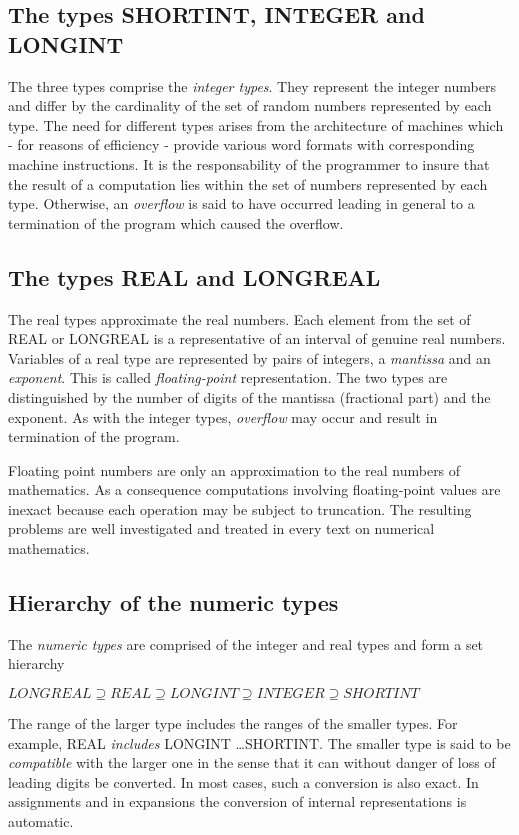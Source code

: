 \documentclass[a4paper,11pt]{article}
\begin{document}
\subsection{The types SHORTINT, INTEGER and LONGINT}\label{subsection:IntegerTypes}
The three types comprise the {\em integer types}. They represent the integer numbers and differ by the cardinality of the set of random numbers represented by each type. The need for different types arises from the architecture of machines which - for reasons of efficiency - provide various word formats with corresponding machine instructions. It is the responsability of the programmer to insure that the result of a computation lies within the set of numbers represented by each type. Otherwise, an {\em overflow} is said to have occurred leading in general to a termination of the program which caused the overflow.

\subsection{The types REAL and LONGREAL} \label{subsection:RealTypes}
The real types approximate the real numbers. Each element from the set of REAL or LONGREAL is a representative of an interval of genuine real numbers. Variables of a real type are represented by pairs of integers, a {\em mantissa} and an {\em exponent}. This is called {\em floating-point} representation. The two types are distinguished by the number of digits of the mantissa (fractional part) and the exponent. As with the integer types, {\em overflow} may occur and result in termination of the program.

Floating point numbers are only an approximation to the real numbers of mathematics. As a consequence computations involving floating-point values are inexact because each operation may be subject to truncation. The resulting problems are well investigated and treated in every text on numerical mathematics.

\subsection{Hierarchy of the numeric types} \label{subsection:HierarchyNumericTypes}
The {\em numeric types} are comprised of the integer and real types and form a set hierarchy

$LONGREAL \supseteq REAL \supseteq LONGINT \supseteq INTEGER \supseteq SHORTINT$

The range of the larger type includes the ranges of the smaller types. For example, REAL {\em includes} LONGINT \ldots SHORTINT. The smaller type is said to be {\em compatible} with the larger one in the sense that it can without danger of loss of leading digits be converted. In most cases, such a conversion is also exact. In assignments and in expansions the conversion of internal representations is automatic.
\end{document}
